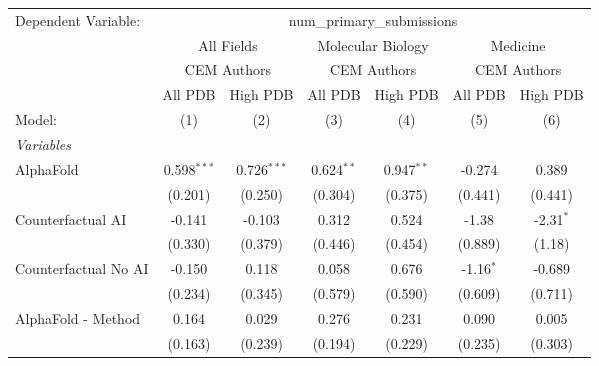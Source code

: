 \begingroup
\centering
\begin{tabular}{lcccccc}
   \tabularnewline \midrule \midrule
   Dependent Variable: & \multicolumn{6}{c}{num\_primary\_submissions}\\
 & \multicolumn{2}{c}{All Fields} & \multicolumn{2}{c}{Molecular Biology} & \multicolumn{2}{c}{Medicine} \\
\cmidrule(lr){2-3} \cmidrule(lr){4-5} \cmidrule(lr){6-7}
 & \multicolumn{2}{c}{CEM Authors} & \multicolumn{2}{c}{CEM Authors} & \multicolumn{2}{c}{CEM Authors} \\
\cmidrule(lr){2-3} \cmidrule(lr){4-5} \cmidrule(lr){6-7}
 & \multicolumn{1}{c}{All PDB} & \multicolumn{1}{c}{High PDB} & \multicolumn{1}{c}{All PDB} & \multicolumn{1}{c}{High PDB} & \multicolumn{1}{c}{All PDB} & \multicolumn{1}{c}{High PDB} \\
\cmidrule(lr){2-2} \cmidrule(lr){3-3} \cmidrule(lr){4-4} \cmidrule(lr){5-5} \cmidrule(lr){6-6} \cmidrule(lr){7-7}
   Model:                                                     & (1)           & (2)           & (3)          & (4)          & (5)         & (6)\\  
   \midrule
   \emph{Variables}\\
   AlphaFold                                                  & 0.598$^{***}$ & 0.726$^{***}$ & 0.624$^{**}$ & 0.947$^{**}$ & -0.274      & 0.389\\   
                                                              & (0.201)       & (0.250)       & (0.304)      & (0.375)      & (0.441)     & (0.441)\\   
   Counterfactual AI                                          & -0.141        & -0.103        & 0.312        & 0.524        & -1.38       & -2.31$^{*}$\\   
                                                              & (0.330)       & (0.379)       & (0.446)      & (0.454)      & (0.889)     & (1.18)\\   
   Counterfactual No AI                                       & -0.150        & 0.118         & 0.058        & 0.676        & -1.16$^{*}$ & -0.689\\   
                                                              & (0.234)       & (0.345)       & (0.579)      & (0.590)      & (0.609)     & (0.711)\\   
   AlphaFold - Method                                         & 0.164         & 0.029         & 0.276        & 0.231        & 0.090       & 0.005\\   
                                                              & (0.163)       & (0.239)       & (0.194)      & (0.229)      & (0.235)     & (0.303)\\   

\end{tabular}
